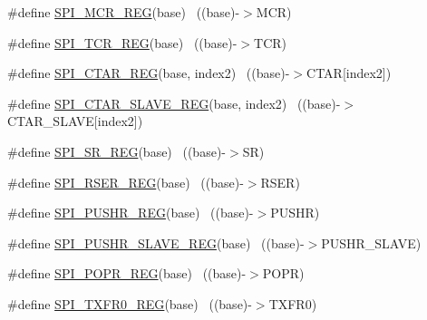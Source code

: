 \begin{DoxyCompactItemize}
\item 
\#define \hyperlink{group___s_p_i___register___accessor___macros_gae54fdee07e5ec098efe6da63f34f2ecd}{S\+P\+I\+\_\+\+M\+C\+R\+\_\+\+R\+EG}(base)                                            ~((base)-\/$>$M\+CR)
\item 
\#define \hyperlink{group___s_p_i___register___accessor___macros_gac7b659989db7f592b223186299d8535e}{S\+P\+I\+\_\+\+T\+C\+R\+\_\+\+R\+EG}(base)                                            ~((base)-\/$>$T\+CR)
\item 
\#define \hyperlink{group___s_p_i___register___accessor___macros_ga5ab762c9000b796d14c1ce822eefc436}{S\+P\+I\+\_\+\+C\+T\+A\+R\+\_\+\+R\+EG}(base,  index2)                            ~((base)-\/$>$C\+T\+AR\mbox{[}index2\mbox{]})
\item 
\#define \hyperlink{group___s_p_i___register___accessor___macros_ga2025336cecfcf0c5b7cdb30e8056505b}{S\+P\+I\+\_\+\+C\+T\+A\+R\+\_\+\+S\+L\+A\+V\+E\+\_\+\+R\+EG}(base,  index2)                ~((base)-\/$>$C\+T\+A\+R\+\_\+\+S\+L\+A\+VE\mbox{[}index2\mbox{]})
\item 
\#define \hyperlink{group___s_p_i___register___accessor___macros_ga0621f5a9016db52860125b33dd3519a2}{S\+P\+I\+\_\+\+S\+R\+\_\+\+R\+EG}(base)                                              ~((base)-\/$>$SR)
\item 
\#define \hyperlink{group___s_p_i___register___accessor___macros_ga9f132bbe51ac921e48eb67afd580ed34}{S\+P\+I\+\_\+\+R\+S\+E\+R\+\_\+\+R\+EG}(base)                                          ~((base)-\/$>$R\+S\+ER)
\item 
\#define \hyperlink{group___s_p_i___register___accessor___macros_gacca7ae364ed1cf69ce3a13c76691ce63}{S\+P\+I\+\_\+\+P\+U\+S\+H\+R\+\_\+\+R\+EG}(base)                                        ~((base)-\/$>$P\+U\+S\+HR)
\item 
\#define \hyperlink{group___s_p_i___register___accessor___macros_gab2be31eae2e6d72caaac8897ed48099f}{S\+P\+I\+\_\+\+P\+U\+S\+H\+R\+\_\+\+S\+L\+A\+V\+E\+\_\+\+R\+EG}(base)                            ~((base)-\/$>$P\+U\+S\+H\+R\+\_\+\+S\+L\+A\+VE)
\item 
\#define \hyperlink{group___s_p_i___register___accessor___macros_ga57ef11c450e1a45e272be2849083977b}{S\+P\+I\+\_\+\+P\+O\+P\+R\+\_\+\+R\+EG}(base)                                          ~((base)-\/$>$P\+O\+PR)
\item 
\#define \hyperlink{group___s_p_i___register___accessor___macros_ga71b7e1c40b7f2d11e956b9814be20261}{S\+P\+I\+\_\+\+T\+X\+F\+R0\+\_\+\+R\+EG}(base)                                        ~((base)-\/$>$T\+X\+F\+R0)

\end{DoxyCompactItemize}
